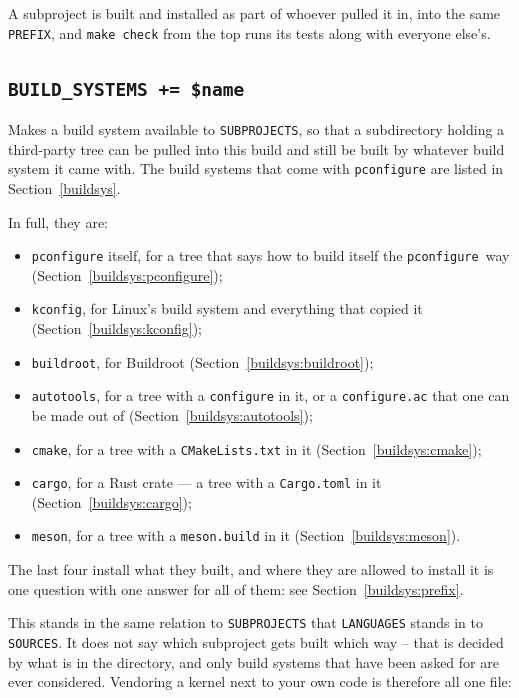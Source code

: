 \documentclass{article}
\newcommand{\pconfigure}{\texttt{pconfigure}}
\begin{document}
A subproject is built and installed as part of whoever pulled it in,
into the same \texttt{PREFIX}, and \texttt{make check} from the top
runs its tests along with everyone else's.

\subsection{\texttt{BUILD\_SYSTEMS += \$name} \label{cmd:build_systems}}

Makes a build system available to \texttt{SUBPROJECTS}, so that a
subdirectory holding a third-party tree can be pulled into this build
and still be built by whatever build system it came with.  The build
systems that come with \texttt{pconfigure} are listed in
Section~\ref{buildsys}.

In full, they are:

\begin{itemize}
\item \texttt{pconfigure} itself, for a tree that says how to build
  itself the \pconfigure\ way (Section~\ref{buildsys:pconfigure});

\item \texttt{kconfig}, for Linux's build system and everything that
  copied it (Section~\ref{buildsys:kconfig});

\item \texttt{buildroot}, for Buildroot
  (Section~\ref{buildsys:buildroot});

\item \texttt{autotools}, for a tree with a \texttt{configure} in it,
  or a \texttt{configure.ac} that one can be made out of
  (Section~\ref{buildsys:autotools});

\item \texttt{cmake}, for a tree with a \texttt{CMakeLists.txt} in it
  (Section~\ref{buildsys:cmake});

\item \texttt{cargo}, for a Rust crate --- a tree with a
  \texttt{Cargo.toml} in it (Section~\ref{buildsys:cargo});

\item \texttt{meson}, for a tree with a \texttt{meson.build} in it
  (Section~\ref{buildsys:meson}).
\end{itemize}

The last four install what they built, and where they are allowed to
install it is one question with one answer for all of them: see
Section~\ref{buildsys:prefix}.

This stands in the same relation to \texttt{SUBPROJECTS} that
\texttt{LANGUAGES} stands in to \texttt{SOURCES}.  It does not say
which subproject gets built which way -- that is decided by what is
in the directory, and only build systems that have been asked for are
ever considered.  Vendoring a kernel next to your own code is
therefore all one file:
\end{document}
